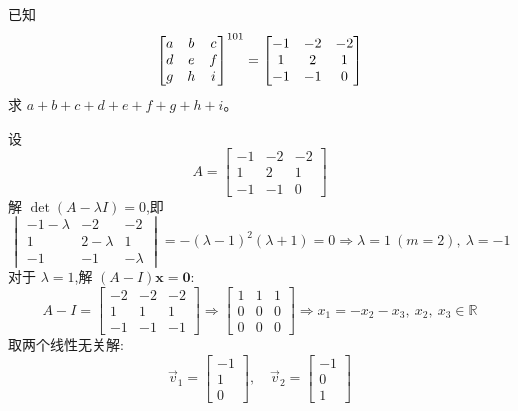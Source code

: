 \begin{questions}
    \question 已知
    \[
    \begin{bmatrix}
    a & b & c \\
    d & e & f \\
    g & h & i
    \end{bmatrix}^{101}
    =
    \begin{bmatrix}
    -1 & -2 & -2 \\
    1 & 2 & 1 \\
    -1 & -1 & 0
    \end{bmatrix}\\[2mm]
    \]
    求 $a + b + c + d + e + f + g + h + i$。
    \begin{solution}
        设
        \[
        A = \begin{bmatrix}
        -1 & -2 & -2 \\
        1 & 2 & 1 \\
        -1 & -1 & 0
        \end{bmatrix}
        \]
        解 $\det(A - \lambda I) = 0$,即
        \[
        \begin{vmatrix}
        -1-\lambda & -2 & -2 \\
        1 & 2-\lambda & 1 \\
        -1 & -1 & -\lambda
        \end{vmatrix}
        = -(\lambda - 1)^2(\lambda + 1) =0 \Rightarrow \lambda = 1 \ (m=2), \ \lambda = -1
        \]
        对于 $\lambda = 1$,解 $(A - I)\textbf{x} = \textbf{0}$:
        \[
        A - I =
        \begin{bmatrix}
        -2 & -2 & -2 \\
        1 & 1 & 1 \\
        -1 & -1 & -1
        \end{bmatrix}
        \Rightarrow
        \begin{bmatrix}
        1 & 1 & 1 \\
        0 & 0 & 0 \\
        0 & 0 & 0
        \end{bmatrix}
        \Rightarrow x_1 = -x_2 - x_3,\ x_2,\ x_3 \in \mathbb{R}
        \]
        取两个线性无关解:
        \[
        \vec{v}_1 =
        \begin{bmatrix}
        -1 \\ 1 \\ 0
        \end{bmatrix},\quad
        \vec{v}_2 =
        \begin{bmatrix}
        -1 \\ 0 \\ 1

\end{bmatrix}\]
\end{solution}
\end{questions}
